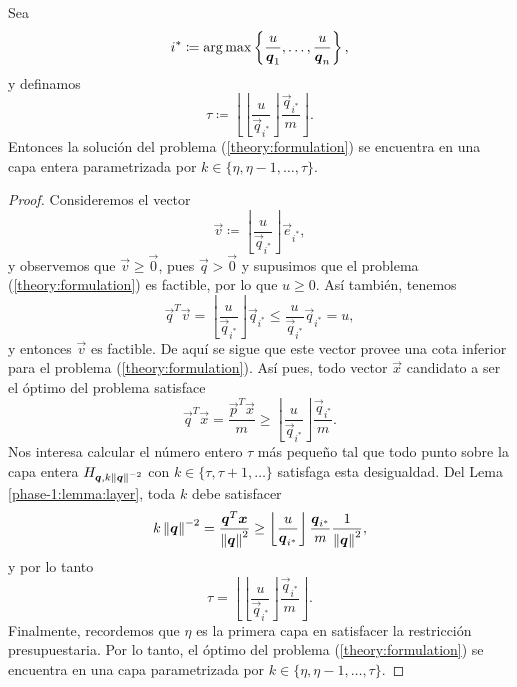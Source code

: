 \begin{lemma}
	Sea
	\begin{equation*}
		\label{eq:last-index}
		i^* \coloneq \operatorname{arg\,max} \left\lbrace \frac{u}{\boldsymbol{q}_1}, \ldots, \frac{u}{\boldsymbol{q}_n} \right\rbrace,
	\end{equation*}
	y definamos
	\begin{equation*}
		\tau \coloneq \left\lfloor \left\lfloor \frac{u}{\vec{q}_{i^*}} \right\rfloor
			\frac{\vec{q}_{i^*}}{m} \right\rfloor.
	\end{equation*}
	Entonces la solución del problema (\ref{theory:formulation}) se encuentra en una capa entera
	parametrizada por $k \in \lbrace \eta, \eta - 1, \ldots, \tau \rbrace$.
\end{lemma}
\begin{proof}
	Consideremos el vector
	\begin{equation*}
		\vec{v} \coloneq \left\lfloor \frac{u}{\vec{q}_{i^*}} \right\rfloor \vec{e}_{i^*},
	\end{equation*}
	y observemos que $\vec{v} \geq \vec{0}$, pues $\vec{q} > \vec{0}$ y supusimos que el problema
	(\ref{theory:formulation}) es factible, por lo que $u \geq 0$. Así también, tenemos
	\begin{equation*}
		\vec{q}^T\vec{v} = \left\lfloor \frac{u}{\vec{q}_{i^*}} \right\rfloor \vec{q}_{i^*}
		\leq \frac{u}{\vec{q}_{i^*}}\vec{q}_{i^*} = u,
	\end{equation*}
	y entonces $\vec{v}$ es factible. De aquí se sigue que este vector provee una cota inferior para
	el problema (\ref{theory:formulation}). Así pues, todo vector $\vec{x}$ candidato a ser el
	óptimo del problema satisface
	\begin{equation*}
		\vec{q}^T\vec{x} = \frac{\vec{p}^T\vec{x}}{m} \geq \left\lfloor \frac{u}{\vec{q}_{i^*}}
		\right\rfloor \frac{\vec{q}_{i^*}}{m}.
	\end{equation*}
	Nos interesa calcular el número entero $\tau$ más pequeño tal que todo punto sobre la capa
	entera $H_{\boldsymbol{q}, k\left\lVert \boldsymbol{q} \right\rVert^{-2}}$ con $k \in \lbrace \tau, \tau + 1, \ldots \rbrace$
	satisfaga esta desigualdad. Del Lema \ref{phase-1:lemma:layer}, toda $k$ debe satisfacer
	\begin{equation*}
		k\left\lVert \boldsymbol{q} \right\rVert^{-2} = \frac{\boldsymbol{q}^T\boldsymbol{x}}{\left\lVert \boldsymbol{q} \right\rVert^2} \geq
		\left\lfloor \frac{u}{\boldsymbol{q}_{i^*}} \right\rfloor \frac{\boldsymbol{q}_{i^*}}{m}
		\frac{1}{\left\lVert \boldsymbol{q} \right\rVert^2},
	\end{equation*}
	y por lo tanto
	\begin{equation*}
		\tau =
		\left\lfloor \left\lfloor \frac{u}{\vec{q}_{i^*}} \right\rfloor \frac{\vec{q}_{i^*}}{m}
			\right\rfloor.
	\end{equation*}
	Finalmente, recordemos que $\eta$ es la primera capa en satisfacer la restricción presupuestaria.
	Por lo tanto, el óptimo del problema (\ref{theory:formulation}) se encuentra en una capa
	parametrizada por $k \in \lbrace \eta, \eta - 1, \ldots, \tau \rbrace$.
\end{proof}

